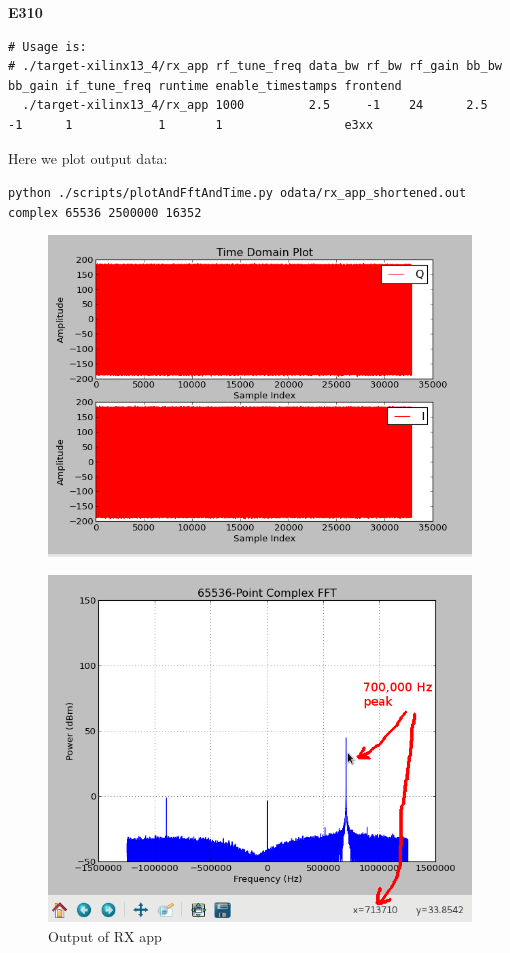 \small
\normalsize
\noindent\textbf{E310}\\
\scriptsize
\noindent
\begin{verbatim}
# Usage is:
# ./target-xilinx13_4/rx_app rf_tune_freq data_bw rf_bw rf_gain bb_bw bb_gain if_tune_freq runtime enable_timestamps frontend
  ./target-xilinx13_4/rx_app 1000         2.5     -1    24      2.5   -1      1            1       1                 e3xx
\end{verbatim}
\par\medskip
\small
\noindent Here we plot output data:\par\medskip
\noindent\texttt{python ./scripts/plotAndFftAndTime.py odata/rx\_app\_shortened.out complex 65536 2500000 16352}\par\medskip
        \begin{figure}[H]
                \centering
                \includegraphics[scale=.5]{rx_app_sig_gen_time_domain}
                \label{fig:rx_app_sig_gen_time_domain}
        \end{figure}
        \begin{figure}[H]
                \centering
                \includegraphics[scale=.5]{rx_app_sig_gen_fft}
                \caption{Output of RX app}
                \label{fig:rx_app_sig_gen_fft}
        \end{figure}
